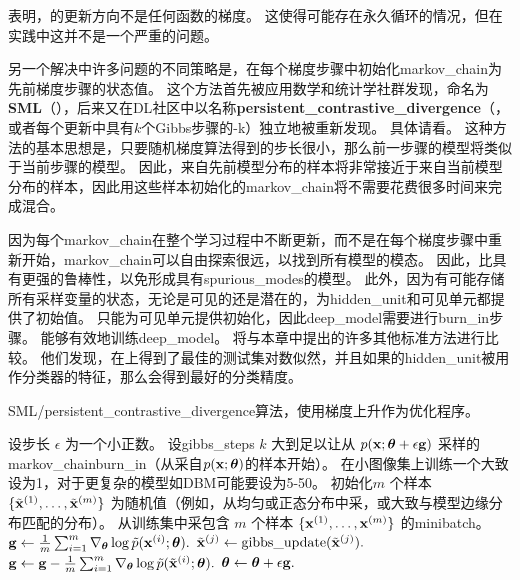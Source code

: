 \cite{sutskever2010convergence-small}表明，的更新方向不是任何函数的梯度。
这使得可能存在永久循环的情况，但在实践中这并不是一个严重的问题。


另一个解决中许多问题的不同策略是，在每个梯度步骤中初始化\gls{markov_chain}为先前梯度步骤的状态值。
这个方法首先被应用数学和统计学社群发现，命名为\textbf{\gls{SML}}（）\citep{Younes98onthe}，后来又在\gls{DL}社区中以名称\textbf{\gls{persistent_contrastive_divergence}}（，或者每个更新中具有$k$个Gibbs步骤的-k）独立地被重新发现\citep{Tieleman08-small}。
具体请看。
这种方法的基本思想是，只要随机梯度算法得到的步长很小，那么前一步骤的模型将类似于当前步骤的模型。
因此，来自先前模型分布的样本将非常接近于来自当前模型分布的样本，因此用这些样本初始化的\gls{markov_chain}将不需要花费很多时间来完成混合。


因为每个\gls{markov_chain}在整个学习过程中不断更新，而不是在每个梯度步骤中重新开始，\gls{markov_chain}可以自由探索很远，以找到所有模型的模态。
因此，比具有更强的鲁棒性，以免形成具有\gls{spurious_modes}的模型。
此外，因为有可能存储所有采样变量的状态，无论是可见的还是潜在的，为\gls{hidden_unit}和可见单元都提供了初始值。
只能为可见单元提供初始化，因此\gls{deep_model}需要进行\gls{burn_in}步骤。
能够有效地训练\gls{deep_model}。
\cite{Marlin10Inductive-small}将与本章中提出的许多其他标准方法进行比较。
他们发现，在上得到了最佳的测试集对数似然，并且如果的\gls{hidden_unit}被用作分类器的特征，那么会得到最好的分类精度。

\begin{algorithm}[ht]
\caption{\gls{SML}/\gls{persistent_contrastive_divergence}算法，使用梯度上升作为优化程序。}
\label{alg:sml}
\begin{algorithmic}
\STATE 设步长 $\epsilon$ 为一个小正数。
\STATE 设\gls{gibbs_steps} $k$ 大到足以让从 $p(\mathbf{x}; \boldsymbol{\theta} + \epsilon \mathbf{g})$ 采样的\gls{markov_chain}\gls{burn_in}（从采自$p(\mathbf{x}; \boldsymbol{\theta})$的样本开始）。
在小图像集上训练一个大致设为1，对于更复杂的模型如\gls{DBM}可能要设为5-50。
\STATE  初始化$m$ 个样本 $\{ \tilde{\mathbf{x}}^{(1)}, \dots, \tilde{\mathbf{x}}^{(m)} \}$ 为随机值（例如，从均匀或正态分布中采，或大致与模型边缘分布匹配的分布）。
\STATE 从训练集中采包含 $m$ 个样本 $\{ \mathbf{x}^{(1)}, \dots, \mathbf{x}^{(m)}\}$ 的\gls{minibatch}。
\STATE $\mathbf{g} \leftarrow \frac{1}{m} \sum_{i=1}^m \nabla_{\boldsymbol{\theta}} \log \tilde{p}(\mathbf{x}^{(i)}; \boldsymbol{\theta}).$
        \STATE $\tilde{\mathbf{x}}^{(j)} \leftarrow \text{gibbs\_update}(\tilde{\mathbf{x}}^{(j)}).$
    \ENDFOR
\ENDFOR
\STATE $\mathbf{g} \leftarrow \mathbf{g} - \frac{1}{m} \sum_{i=1}^m \nabla_{\boldsymbol{\theta}} \log \tilde{p}( \tilde{\mathbf{x}}^{(i)} ; \boldsymbol{\theta} ).$
\STATE $\boldsymbol{\theta} \leftarrow \boldsymbol{\theta} + \epsilon \mathbf{g}.$
\ENDWHILE
\end{algorithmic}
\end{algorithm}


